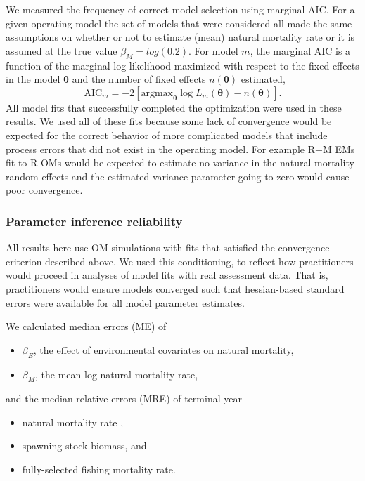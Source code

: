 \documentclass[
  12pt,
]{article}
\begin{document}
We measured the frequency of correct model selection using marginal AIC. For a given operating model the set of models that were considered all made the same assumptions on whether or not to estimate (mean) natural mortality rate or it is assumed at the true value \(\beta_M = log(0.2)\). For model \(m\), the marginal AIC is a function of the marginal log-likelihood maximized with respect to the fixed effects in the model \(\boldsymbol{\theta}\) and the number of fixed effects \(n\left(\boldsymbol{\theta}\right)\) estimated,
\[
\text{AIC}_m = -2\left[{\text{argmax}}_{\boldsymbol{\theta}} \log L_m\left({\boldsymbol{\theta}}\right) - n\left({\boldsymbol{\theta}}\right)\right].
\]
All model fits that successfully completed the optimization were used in these results. We used all of these fits because some lack of convergence would be expected for the correct behavior of more complicated models that include process errors that did not exist in the operating model. For example R+M EMs fit to R OMs would be expected to estimate no variance in the natural mortality random effects and the estimated variance parameter going to zero would cause poor convergence.

\hypertarget{parameter-inference-reliability}{%
\subsubsection*{Parameter inference reliability}\label{parameter-inference-reliability}}

All results here use OM simulations with fits that satisfied the convergence criterion described above. We used this conditioning, to reflect how practitioners would proceed in analyses of model fits with real assessment data. That is, practitioners would ensure models converged such that hessian-based standard errors were available for all model parameter estimates.

We calculated median errors (ME) of

\begin{itemize}
\item $\beta_E$, the effect of environmental covariates on natural mortality, 
\item $\beta_M$, the mean log-natural mortality rate,
\end{itemize}

and the median relative errors (MRE) of terminal year

\begin{itemize}
\item natural mortality rate ,
\item spawning stock biomass, and
\item fully-selected fishing mortality rate.
\end{itemize}
\end{document}
